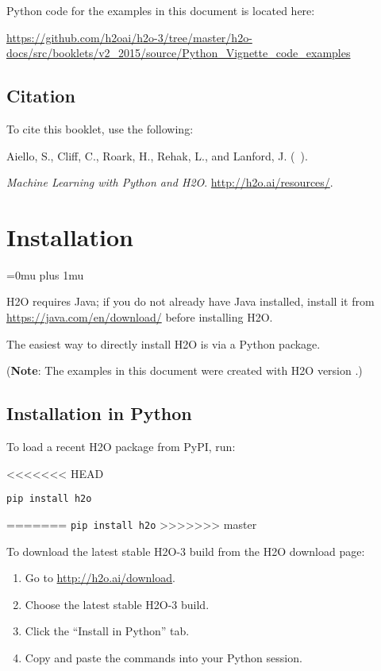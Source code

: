 Python code for the examples in this document is located here:

\url{https://github.com/h2oai/h2o-3/tree/master/h2o-docs/src/booklets/v2_2015/source/Python_Vignette_code_examples}

\subsection{Citation}

To cite this booklet, use the following: 

Aiello, S., Cliff, C., Roark, H., Rehak, L., and Lanford, J. (\shortmonthname\ \the\year). {\textit{Machine Learning with Python and H2O}. {\url{http://h2o.ai/resources/}}.


\section{Installation} 
\Urlmuskip=0mu plus 1mu\relax %

H2O requires Java; if you do not already have Java installed, install it from {\url{https://java.com/en/download/}} before installing H2O. 

The easiest way to directly install H2O is  via a Python package.

({\bf{Note}}: The examples in this document were created with H2O version \waterVersion.)

\subsection{Installation in Python}

To load a recent H2O package from PyPI, run:

<<<<<<< HEAD
\begin{lstlisting}[style=pythoncode]
pip install h2o
\end{lstlisting}
=======
{\texttt{pip install h2o}}
>>>>>>> master

To download the
latest stable H2O-3 build from the H2O download page:

\begin{enumerate}
\item Go to {\url{http://h2o.ai/download}}.
\item Choose the latest stable H2O-3 build.
\item Click the ``Install in Python'' tab.
\item Copy and paste the commands into your Python session.
\end{enumerate}

}
